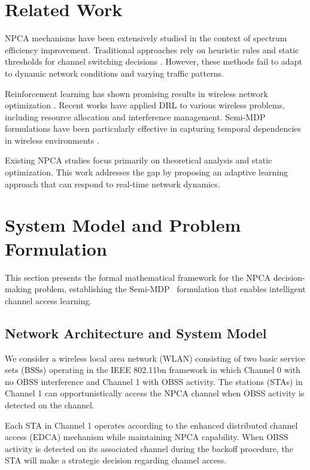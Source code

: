 \documentclass[conference]{IEEEtran}
\begin{document}
\section{Related Work}

NPCA mechanisms have been extensively studied in the context of spectrum efficiency improvement. Traditional approaches rely on heuristic rules and static thresholds for channel switching decisions \cite{wei2024optimized}. However, these methods fail to adapt to dynamic network conditions and varying traffic patterns.

Reinforcement learning has shown promising results in wireless network optimization \cite{mnih2013playing}. Recent works have applied DRL to various wireless problems, including resource allocation and interference management. Semi-MDP formulations have been particularly effective in capturing temporal dependencies in wireless environments \cite{sutton2018reinforcement}.

Existing NPCA studies focus primarily on theoretical analysis and static optimization. This work addresses the gap by proposing an adaptive learning approach that can respond to real-time network dynamics.

\section{System Model and Problem Formulation}

This section presents the formal mathematical framework for the NPCA decision-making problem, establishing the Semi-MDP~\cite{sutton1999between} formulation that enables intelligent channel access learning.

\subsection{Network Architecture and System Model}

We consider a wireless local area network (WLAN) consisting of two basic service sets (BSSs) operating in the IEEE 802.11bn framework in which Channel 0 with no OBSS interference and Channel 1 with OBSS activity. The stations (STAs) in Channel 1 can opportunistically access the NPCA channel when OBSS activity is detected on the channel.

Each STA in Channel 1 operates according to the enhanced distributed channel access (EDCA) mechanism while maintaining NPCA capability. When OBSS activity is detected on its associated channel during the backoff procedure, the STA will make a strategic decision regarding channel access.
\end{document}
